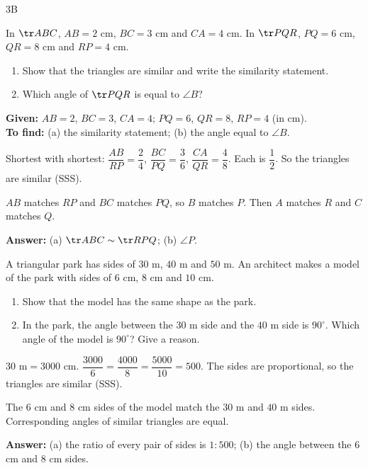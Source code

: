 \begin{exercise}{3B}
\item In $\tr ABC$, $AB=2$ cm, $BC=3$ cm and $CA=4$ cm. In $\tr PQR$, $PQ=6$ cm, $QR=8$ cm and $RP=4$ cm.
\begin{enumerate}[label=(\alph*),itemsep=1pt]
  \item Show that the triangles are similar and write the similarity statement.
  \item Which angle of $\tr PQR$ is equal to $\angle B$?
\end{enumerate}
\begin{solution}
\textbf{Given:} $AB=2$, $BC=3$, $CA=4$; $PQ=6$, $QR=8$, $RP=4$ (in cm).\\
\textbf{To find:} (a) the similarity statement; (b) the angle equal to $\angle B$.
\begin{steps}
  \item Shortest with shortest: $\dfrac{AB}{RP}=\dfrac24$, $\dfrac{BC}{PQ}=\dfrac36$, $\dfrac{CA}{QR}=\dfrac48$. Each is $\dfrac12$. So the triangles are similar (SSS).
  \item $AB$ matches $RP$ and $BC$ matches $PQ$, so $B$ matches $P$. Then $A$ matches $R$ and $C$ matches $Q$.
\end{steps}
\textbf{Answer:} (a) $\tr ABC\sim\tr RPQ$; (b) $\angle P$.
\end{solution}

\item A triangular park has sides of $30$ m, $40$ m and $50$ m. An architect makes a model of the park with sides of $6$ cm, $8$ cm and $10$ cm.
\begin{enumerate}[label=(\alph*),itemsep=1pt]
  \item Show that the model has the same shape as the park.
  \item In the park, the angle between the $30$ m side and the $40$ m side is $90^\circ$. Which angle of the model is $90^\circ$? Give a reason.
\end{enumerate}
\begin{solution}
\begin{steps}
  \item[(a)] $30\text{ m}=3000$ cm. $\dfrac{3000}{6}=\dfrac{4000}{8}=\dfrac{5000}{10}=500$. The sides are proportional, so the triangles are similar (SSS).
  \item[(b)] The $6$ cm and $8$ cm sides of the model match the $30$ m and $40$ m sides. Corresponding angles of similar triangles are equal.
\end{steps}
\textbf{Answer:} (a) the ratio of every pair of sides is $1:500$; (b) the angle between the $6$ cm and $8$ cm sides.
\end{solution}
\end{exercise}


